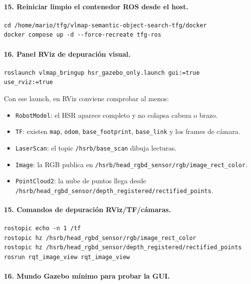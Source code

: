 \documentclass[11pt,a4paper]{article}
\begin{document}
\paragraph{15. Reiniciar limpio el contenedor ROS desde el host.}

\begin{verbatim}
cd /home/mario/tfg/vlmap-semantic-object-search-tfg/docker
docker compose up -d --force-recreate tfg-ros
\end{verbatim}

\paragraph{16. Panel RViz de depuración visual.}

\begin{verbatim}
roslaunch vlmap_bringup hsr_gazebo_only.launch gui:=true use_rviz:=true
\end{verbatim}

Con ese launch, en RViz conviene comprobar al menos:
\begin{itemize}
  \item \texttt{RobotModel}: el HSR aparece completo y no colapsa cabeza o
        brazo.
  \item \texttt{TF}: existen \texttt{map}, \texttt{odom},
        \texttt{base\_footprint}, \texttt{base\_link} y los frames de cámara.
  \item \texttt{LaserScan}: el topic \texttt{/hsrb/base\_scan} dibuja lecturas.
  \item \texttt{Image}: la RGB publica en
        \texttt{/hsrb/head\_rgbd\_sensor/rgb/image\_rect\_color}.
  \item \texttt{PointCloud2}: la nube de puntos llega desde
        \texttt{/hsrb/head\_rgbd\_sensor/depth\_registered/rectified\_points}.
\end{itemize}

\paragraph{15. Comandos de depuración RViz/TF/cámaras.}

\begin{verbatim}
rostopic echo -n 1 /tf
rostopic hz /hsrb/head_rgbd_sensor/rgb/image_rect_color
rostopic hz /hsrb/head_rgbd_sensor/depth_registered/rectified_points
rosrun rqt_image_view rqt_image_view
\end{verbatim}

\paragraph{16. Mundo Gazebo mínimo para probar la GUI.}
\end{document}
